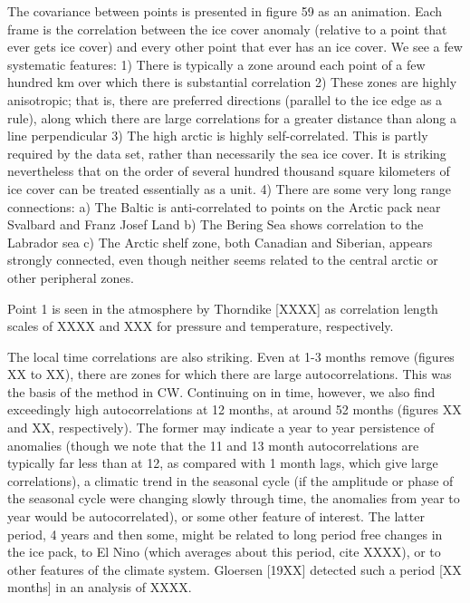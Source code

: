   The covariance between points is presented in figure 59 as an animation.
Each frame is the correlation between the ice cover anomaly (relative to a
point that ever gets ice cover) and every other point that ever has an ice
cover.  We see a few systematic features: 
  1) There is typically a zone around each point of a few hundred km over 
which there is substantial correlation
  2) These zones are highly anisotropic; that is, there are preferred
directions (parallel to the ice edge as a rule), along which there are 
large correlations for a greater distance than along a line perpendicular
  3) The high arctic is highly self-correlated.  This is partly required
by the data set, rather than necessarily the sea ice cover.  It is striking
nevertheless that on the order of several hundred thousand square kilometers
of ice cover can be treated essentially as a unit.    
  4) There are some very long range connections:
    a) The Baltic is anti-correlated to points on the Arctic pack near
        Svalbard and Franz Josef Land
    b) The Bering Sea shows correlation to the Labrador sea
    c) The Arctic shelf zone, both Canadian and Siberian, appears
        strongly connected, even though neither seems related to the
        central arctic or other peripheral zones. 

Point 1 is seen in the atmosphere by Thorndike [XXXX] as correlation length
scales of XXXX and XXX for pressure and temperature, respectively.


  The local time correlations are also striking.  Even at 1-3 months 
remove (figures XX to XX), there are zones for which there are large 
autocorrelations.  This was the basis of the method in CW.  Continuing 
on in time, however, we also find exceedingly high autocorrelations at 
12 months, at around 52 months (figures XX and XX, respectively).  The 
former may indicate a year to year persistence of anomalies (though we 
note that the 11 and 13 month autocorrelations are typically far less 
than at 12, as compared with 1 month lags, which give large correlations), 
a climatic trend in the seasonal cycle (if the amplitude or phase of the 
seasonal cycle were changing slowly through time, the anomalies from year 
to year would be autocorrelated), or some other feature of interest. The
latter period, 4 years and then some, might be related to long period
free changes in the ice pack, to El Nino (which averages about this period,
cite XXXX), or to other features of the climate system.  Gloersen [19XX]
detected such a period [XX months] in an analysis of XXXX.  

